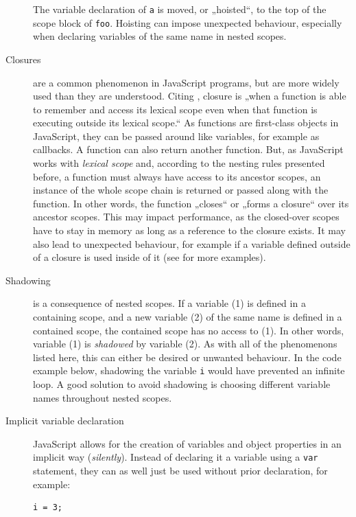 \begin{description}
The variable declaration of \texttt{a} is moved, or „hoisted“, to the
top of the scope block of \texttt{foo}. Hoisting can impose unexpected
behaviour, especially when declaring variables of the same name in
nested scopes.
\item[Closures]
are a common phenomenon in JavaScript programs, but are more widely used
than they are understood. Citing , closure is „when a
function is able to remember and access its lexical scope even when that
function is executing outside its lexical scope.“ \citeyear{getify} As
functions are first-class objects in JavaScript, they can be passed
around like variables, for example as callbacks. A function can also
return another function. But, as JavaScript works with \emph{lexical
scope} and, according to the nesting rules presented before, a function
must always have access to its ancestor scopes, an instance of the whole
scope chain is returned or passed along with the function. In other
words, the function „closes“ or „forms a closure“ over its ancestor
scopes. This may impact performance, as the closed-over scopes have to
stay in memory as long as a reference to the closure exists. It may also
lead to unexpected behaviour, for example if a variable defined outside
of a closure is used inside of it (see  for
more examples).
\item[Shadowing]
is a consequence of nested scopes. If a variable (1) is defined in a
containing scope, and a new variable (2) of the same name is defined in
a contained scope, the contained scope has no access to (1). In other
words, variable (1) is \emph{shadowed} by variable (2). As with all of
the phenomenons listed here, this can either be desired or unwanted
behaviour. In the code example below, shadowing the variable \texttt{i}
would have prevented an infinite loop. A good solution to avoid
shadowing is choosing different variable names throughout nested scopes.
\item[Implicit variable declaration]
JavaScript allows for the creation of variables and object properties in
an implicit way (\emph{silently}). Instead of declaring it a variable
using a \texttt{var} statement, they can as well just be used without
prior declaration, for example:

\begin{verbatim}
i = 3;
\end{verbatim}


\end{description}
